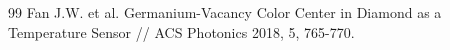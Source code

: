 \begin{thebibliography} {99}
Fan J.W. et al. Germanium-Vacancy Color Center in Diamond
as a Temperature Sensor // ACS Photonics 2018, 5, 765-770.


\end{thebibliography}